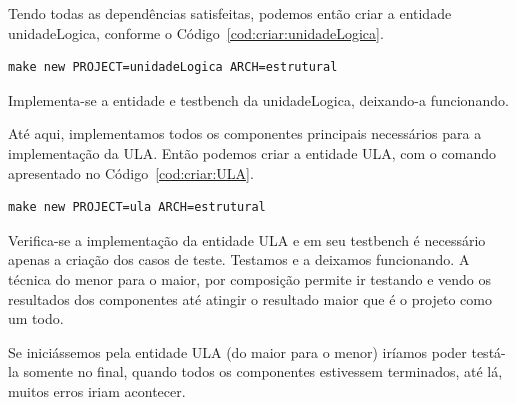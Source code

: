\documentclass[a4paper,11pt]{report}
\begin{document}
Tendo todas as dependências satisfeitas, podemos então criar a entidade unidadeLogica, conforme o Código~\ref{cod:criar:unidadeLogica}.

\lstset{numbers=left, numberstyle=\tiny, stepnumber=1, numbersep=3pt}
\begin{lstlisting}[label=cod:criar:unidadeLogica,caption=Comando para a criar a entidade unidadeLogica.]
  make new PROJECT=unidadeLogica ARCH=estrutural
\end{lstlisting}

Implementa-se a entidade e testbench da unidadeLogica, deixando-a funcionando.

Até aqui, implementamos todos os componentes principais necessários para a implementação da ULA. Então podemos criar a entidade ULA, com o comando apresentado no Código~\ref{cod:criar:ULA}.

\lstset{numbers=left, numberstyle=\tiny, stepnumber=1, numbersep=3pt}
\begin{lstlisting}[label=cod:criar:ULA,caption=Comando para a criar a entidade ULA.]
  make new PROJECT=ula ARCH=estrutural
\end{lstlisting}

Verifica-se a implementação da entidade ULA e em seu testbench é necessário apenas a criação dos casos de teste. Testamos e a deixamos funcionando.
A técnica do menor para o maior, por composição permite ir testando e vendo os resultados dos componentes até atingir o resultado maior que é o projeto como um todo.

Se iniciássemos pela entidade ULA (do maior para o menor) iríamos poder testá-la somente no final, quando todos os componentes estivessem terminados, até lá, muitos erros iriam acontecer.
\end{document}
